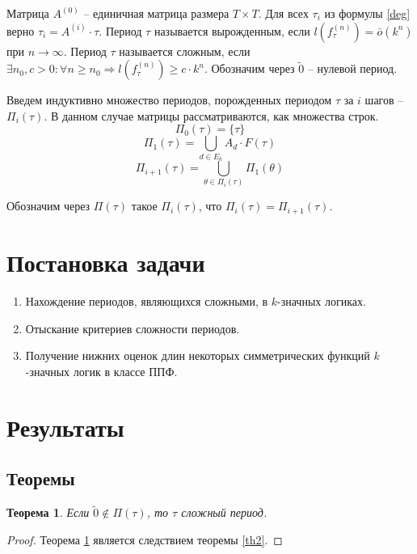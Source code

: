 \documentclass[bibliography=totoc, a4paper, 14pt]{extarticle}
\let\stdsection\section
\renewcommand\section{\newpage\stdsection}
\newtheorem{myth}{Теорема}
\begin{document}
Матрица $A^{(0)}$ -- единичная матрица размера $T \times T$.
Для всех $\tau_i$ из формулы \eqref{deg} верно $\tau_i = A^{(i)} \cdot \tau$.
Период $\tau$ называется вырожденным, если $l(f_{\tau}^{(n)}) = \bar{o}(k^n)$ при $n\rightarrow\infty$.
Период $\tau$ называется сложным, если
$\exists n_0, c > 0 : \forall n \geqslant n_0 \Rightarrow l(f_{\tau}^{(n)}) \geqslant c \cdot k^n$.
Обозначим через $\tilde{0}$ -- нулевой период.

Введем индуктивно множество периодов, порожденных периодом $\tau$ за $i$ шагов -- $\Pi_i(\tau)$.
В данном случае матрицы рассматриваются, как множества строк.
$$\Pi_0(\tau) = \{\tau\}$$
$$\Pi_1(\tau) = \underset{d \in E_k}{\bigcup} A_d \cdot F(\tau)$$
$$\Pi_{i+1}(\tau) = \underset{\theta \in \Pi_i(\tau)}{\bigcup} \Pi_1(\theta)$$

Обозначим через $\Pi(\tau)$ такое $\Pi_i(\tau)$, что $\Pi_i(\tau) = \Pi_{i+1}(\tau)$.

\section{Постановка задачи}
\begin{enumerate}
\item Нахождение периодов, являющихся сложными, в $k$-значных логиках.

\item Отыскание критериев сложности периодов.

\item Получение нижних оценок длин некоторых симметрических функций $k$-значных логик в классе ППФ.
\end{enumerate}

\section{Результаты}
\subsection{Теоремы}
\begin{myth}
\label{th1}
Если $\tilde{0} \not\in \Pi(\tau)$, то $\tau$ сложный период.
\end{myth}
\begin{proof}
Теорема \ref{th1} является следствием теоремы \ref{th2}.
\end{proof}
\end{document}
